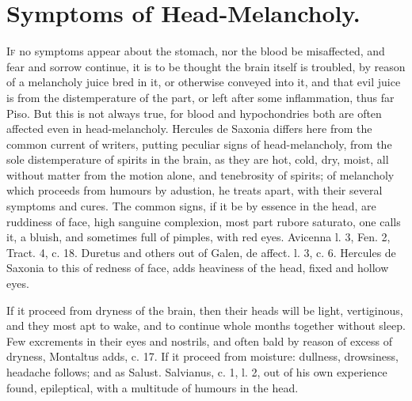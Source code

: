 {%
\section{Symptoms of Head-Melancholy.}

\lettrine{I}{f} no symptoms appear about the stomach, nor the blood be
misaffected, and fear and sorrow continue, it is to be thought the
brain itself is troubled, by reason of a melancholy juice bred in it,
or otherwise conveyed into it, and that evil juice is from the
distemperature of the part, or left after some inflammation, thus far
Piso. But this is not always true, for blood and hypochondries both are
often affected even in head-melancholy. Hercules de Saxonia
differs here from the common current of writers, putting peculiar signs
of head-melancholy, from the sole distemperature of spirits in the
brain, as they are hot, cold, dry, moist, all without matter from the
motion alone, and tenebrosity of spirits; of melancholy which proceeds
from humours by adustion, he treats apart, with their several symptoms
and cures. The common signs, if it be by essence in the head, are
ruddiness of face, high sanguine complexion, most part rubore saturato,
one calls it, a bluish, and sometimes full of pimples, with red
eyes. Avicenna l. 3, Fen. 2, Tract. 4, c. 18. Duretus and others out of
Galen, de affect. l. 3, c. 6. Hercules de Saxonia to this of
redness of face, adds heaviness of the head, fixed and hollow eyes.

If it proceed from dryness of the brain, then their heads will be
light, vertiginous, and they most apt to wake, and to continue whole
months together without sleep. Few excrements in their eyes and
nostrils, and often bald by reason of excess of dryness, Montaltus
adds, c. 17. If it proceed from moisture: dullness, drowsiness,
headache follows; and as Salust. Salvianus, c. 1, l. 2, out of his own
experience found, epileptical, with a multitude of humours in the head.

}
